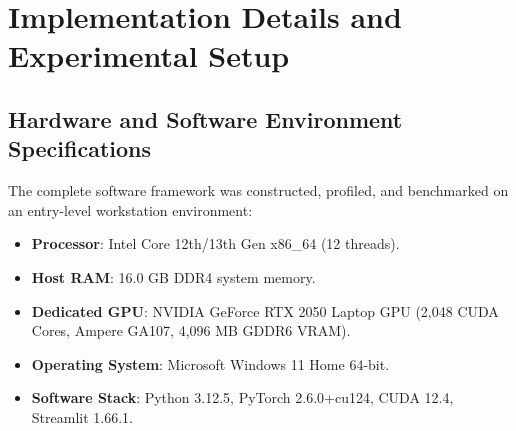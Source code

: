 \documentclass[conference]{IEEEtran}
\begin{document}
\section{Implementation Details and Experimental Setup}

\subsection{Hardware and Software Environment Specifications}
The complete software framework was constructed, profiled, and benchmarked on an entry-level workstation environment:
\begin{itemize}
    \item \textbf{Processor}: Intel Core 12th/13th Gen x86\_64 (12 threads).
    \item \textbf{Host RAM}: 16.0 GB DDR4 system memory.
    \item \textbf{Dedicated GPU}: NVIDIA GeForce RTX 2050 Laptop GPU (2,048 CUDA Cores, Ampere GA107, 4,096 MB GDDR6 VRAM).
    \item \textbf{Operating System}: Microsoft Windows 11 Home 64-bit.
    \item \textbf{Software Stack}: Python 3.12.5, PyTorch 2.6.0+cu124, CUDA 12.4, Streamlit 1.66.1.
\end{itemize}
\end{document}
